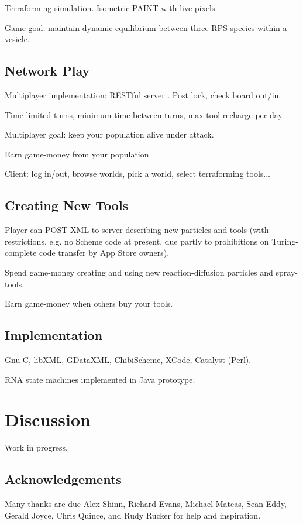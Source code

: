 \documentclass{acm_proc_article-sp}
\begin{document}
Terraforming simulation.
Isometric PAINT with live pixels.

Game goal: maintain dynamic equilibrium between three RPS species within a vesicle.

\subsection{Network Play}

Multiplayer implementation: RESTful server \cite{rest}.
Post lock, check board out/in.

Time-limited turns, minimum time between turns, max tool recharge per day.

Multiplayer goal: keep your population alive under attack.

Earn game-money from your population.

Client: log in/out, browse worlds, pick a world, select terraforming tools...

\subsection{Creating New Tools}

Player can POST XML to server describing new particles and tools
(with restrictions, e.g. no Scheme code at present, due partly to prohibitions on Turing-complete code transfer by App Store owners).

Spend game-money creating and using new reaction-diffusion particles and spray-tools.

Earn game-money when others buy your tools.

\subsection{Implementation}

Gnu C, libXML, GDataXML, ChibiScheme, XCode, Catalyst (Perl).

RNA state machines implemented in Java prototype.

\section{Discussion}

Work in progress.

\subsection{Acknowledgements}

Many thanks are due Alex Shinn, Richard Evans, Michael Mateas, Sean Eddy, Gerald Joyce, Chris Quince,
and Rudy Rucker for help and inspiration.




\balancecolumns
\end{document}
